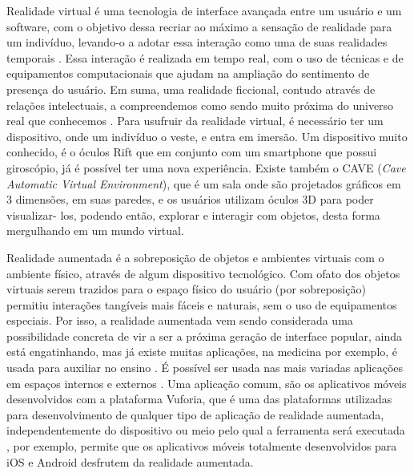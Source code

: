 \documentclass[12pt]{article}
\begin{document}
    Realidade virtual é uma tecnologia de interface avançada entre um usuário e um
    software, com o objetivo dessa recriar ao máximo a sensação de realidade para um indivíduo,
    levando-o a adotar essa interação como uma de suas realidades temporais \cite{livro_IA_BU}. Essa
    interação é realizada em tempo real, com o uso de técnicas e de equipamentos computacionais que
    ajudam na ampliação do sentimento de presença do usuário. Em suma, uma realidade ficcional, contudo
    através de relações intelectuais, a compreendemos como sendo muito próxima do universo real que
    conhecemos \cite{livro_IA_BU}. Para usufruir da realidade virtual, é necessário ter um dispositivo,
    onde um indivíduo o veste, e entra em imersão. Um dispositivo muito conhecido, é o óculos Rift que
    em conjunto com um smartphone que possui giroscópio, já é possível ter uma nova experiência. Existe
    também o CAVE (\textit{Cave Automatic Virtual Environment}), que é um sala onde são projetados
    gráficos em 3 dimensões, em suas paredes, e os usuários utilizam óculos 3D para poder visualizar-
    los, podendo então, explorar e interagir com objetos, desta forma mergulhando em um mundo
    virtual.\cite{caverna}

    \medskip
    Realidade aumentada é a sobreposição de objetos e ambientes virtuais com o ambiente físico, através
    de algum dispositivo tecnológico. Com ofato dos objetos virtuais serem trazidos para o espaço físico
    do usuário (por sobreposição) permitiu interações tangíveis mais fáceis e naturais, sem o uso de
    equipamentos especiais. Por isso, a realidade aumentada vem sendo considerada uma possibilidade
    concreta de vir a ser a próxima geração de interface popular, ainda está engatinhando, mas já existe
    muitas aplicações, na medicina por exemplo, é usada para auxiliar no ensino \cite{aplicacoes_VR}. É
    possível ser usada nas mais variadas aplicações em espaços internos e externos
    \cite{realidadevirtual_e_realidadeaumentada}. Uma aplicação comum, são os aplicativos móveis
    desenvolvidos com a plataforma Vuforia, que é uma das plataformas utilizadas para desenvolvimento de
    qualquer tipo de aplicação de realidade aumentada, independentemente do dispositivo ou meio pelo
    qual a ferramenta será executada \cite{realidadevirtual_e_realidadeaumentada}, por exemplo, permite
    que os aplicativos móveis totalmente desenvolvidos para iOS e Android desfrutem da realidade
    aumentada.\cite{site_vuforia}
\end{document}
